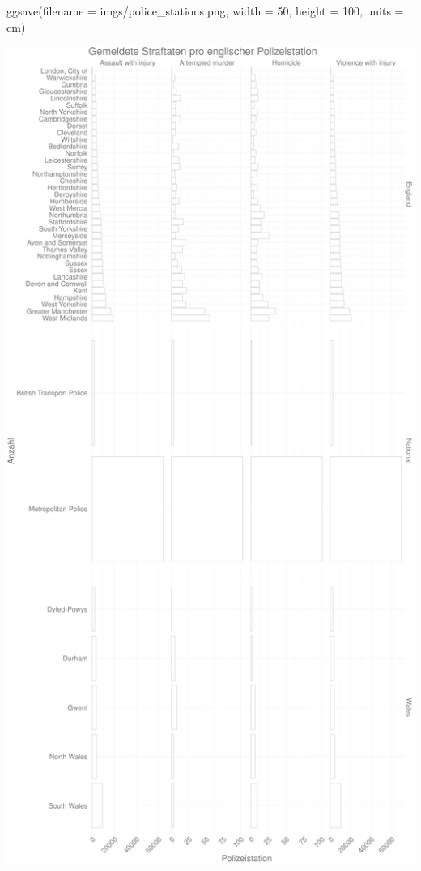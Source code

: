 \documentclass[
]{book}
\newenvironment{Shaded}{\begin{snugshade}}{\end{snugshade}}
\newcommand{\AttributeTok}[1]{\textcolor[rgb]{0.77,0.63,0.00}{#1}}
\newcommand{\DecValTok}[1]{\textcolor[rgb]{0.00,0.00,0.81}{#1}}
\newcommand{\FunctionTok}[1]{\textcolor[rgb]{0.00,0.00,0.00}{#1}}
\newcommand{\NormalTok}[1]{#1}
\newcommand{\StringTok}[1]{\textcolor[rgb]{0.31,0.60,0.02}{#1}}
\begin{document}
\begin{Shaded}
\begin{Highlighting}[]
\FunctionTok{ggsave}\NormalTok{(}\AttributeTok{filename =} \StringTok{\textquotesingle{}imgs/police\_stations.png\textquotesingle{}}\NormalTok{,}
      \AttributeTok{width =} \DecValTok{50}\NormalTok{,}
      \AttributeTok{height =} \DecValTok{100}\NormalTok{,}
      \AttributeTok{units =} \StringTok{\textquotesingle{}cm\textquotesingle{}}\NormalTok{)}
\end{Highlighting}
\end{Shaded}

\begin{center}\includegraphics[width=.8\textwidth]{imgs/police_stations} \end{center}
\end{document}
